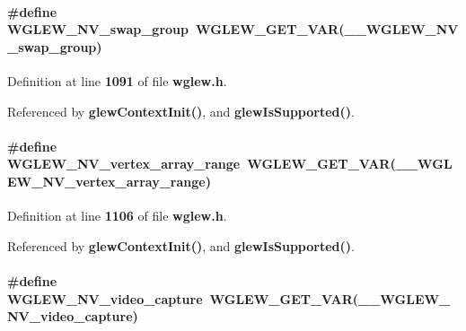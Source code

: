 \paragraph[{W\+G\+L\+E\+W\+\_\+\+N\+V\+\_\+swap\+\_\+group}]{\setlength{\rightskip}{0pt plus 5cm}\#define W\+G\+L\+E\+W\+\_\+\+N\+V\+\_\+swap\+\_\+group~{\bf W\+G\+L\+E\+W\+\_\+\+G\+E\+T\+\_\+\+V\+AR}({\bf \+\_\+\+\_\+\+W\+G\+L\+E\+W\+\_\+\+N\+V\+\_\+swap\+\_\+group})}\label{wglew_8h_a1e592e31963b488f4a3af993884639f6}


Definition at line {\bf 1091} of file {\bf wglew.\+h}.



Referenced by {\bf glew\+Context\+Init()}, and {\bf glew\+Is\+Supported()}.

\paragraph[{W\+G\+L\+E\+W\+\_\+\+N\+V\+\_\+vertex\+\_\+array\+\_\+range}]{\setlength{\rightskip}{0pt plus 5cm}\#define W\+G\+L\+E\+W\+\_\+\+N\+V\+\_\+vertex\+\_\+array\+\_\+range~{\bf W\+G\+L\+E\+W\+\_\+\+G\+E\+T\+\_\+\+V\+AR}({\bf \+\_\+\+\_\+\+W\+G\+L\+E\+W\+\_\+\+N\+V\+\_\+vertex\+\_\+array\+\_\+range})}\label{wglew_8h_a1e28eb14f1c9553fc4ceeb9f62610f6c}


Definition at line {\bf 1106} of file {\bf wglew.\+h}.



Referenced by {\bf glew\+Context\+Init()}, and {\bf glew\+Is\+Supported()}.

\paragraph[{W\+G\+L\+E\+W\+\_\+\+N\+V\+\_\+video\+\_\+capture}]{\setlength{\rightskip}{0pt plus 5cm}\#define W\+G\+L\+E\+W\+\_\+\+N\+V\+\_\+video\+\_\+capture~{\bf W\+G\+L\+E\+W\+\_\+\+G\+E\+T\+\_\+\+V\+AR}({\bf \+\_\+\+\_\+\+W\+G\+L\+E\+W\+\_\+\+N\+V\+\_\+video\+\_\+capture})}\label{wglew_8h_af9d9de3039c51608028f54d37de20539}


